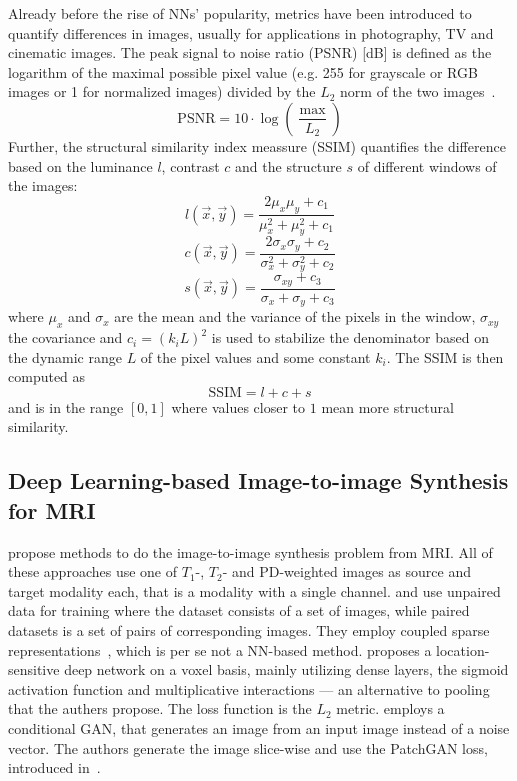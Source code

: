Already before the rise of NNs' popularity, metrics have been introduced to quantify differences in images, usually for applications in photography, TV and cinematic images.
The peak signal to noise ratio (PSNR) [dB] is defined as the logarithm of the maximal possible pixel value (e.g. 255 for grayscale or RGB images or 1 for normalized images) divided by the $L_2$ norm of the two images~\autocite{rao_transform_2018}.
\[ \text{PSNR} = 10 \cdot \log \left( \frac{\max}{L_2} \right) \]
Further, the structural similarity index meassure (SSIM) quantifies the difference based on the luminance $l$, contrast $c$ and the structure $s$ of different windows of the images:
\[ l(\overrightarrow{x}, \overrightarrow{y}) = \frac{2 \mu_x \mu_y + c_1}{\mu_x^2 + \mu_y^2 + c_1} \]
\[ c(\overrightarrow{x}, \overrightarrow{y}) = \frac{2 \sigma_x \sigma_y + c_2}{\sigma_x^2 + \sigma_y^2 + c_2} \]
\[ s(\overrightarrow{x}, \overrightarrow{y}) = \frac{\sigma_{xy} + c_3}{\sigma_x + \sigma_y + c_3} \]
where $\mu_x$ and $\sigma_x$ are the mean and the variance of the pixels in the window, $\sigma_{xy}$ the covariance and $c_i = (k_i L)^2$ is used to stabilize the denominator based on the dynamic range $L$ of the pixel values and some constant $k_i$.
The SSIM is then computed as
\[ \text{SSIM} = l + c + s \]
and is in the range $[0, 1]$ where values closer to $1$ mean more structural similarity.


\subsection{Deep Learning-based Image-to-image Synthesis for MRI}
\autocite{van_nguyen_cross-domain_2015, huang_simultaneous_2017, vemulapalli_unsupervised_2015, yang_mri_2020} propose methods to do the image-to-image synthesis problem from MRI.
All of these approaches use one of $T_1$-, $T_2$- and PD-weighted images as source and target modality each, that is a modality with a single channel.
\autocite{vemulapalli_unsupervised_2015} and \autocite{huang_simultaneous_2017} use unpaired data for training where the dataset consists of a set of images, while paired datasets is a set of pairs of corresponding images.
They employ coupled sparse representations~\autocite{hutchison_robust_2013}, which is per se not a NN-based method.
\autocite{van_nguyen_cross-domain_2015} proposes a location-sensitive deep network on a voxel basis, mainly utilizing dense layers, the sigmoid activation function and multiplicative interactions --- an alternative to pooling that the authers propose.
The loss function is the $L_2$ metric.
\autocite{yang_mri_2020} employs a conditional GAN, that generates an image from an input image instead of a noise vector. The authors generate the image slice-wise and use the PatchGAN loss, introduced in~\autocite{isola_image-image_2017}. \\


